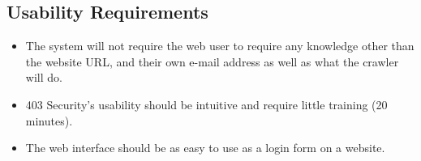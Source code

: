 \subsection{Usability Requirements}
\begin{itemize} 
    \item The system will not require the web user to require any knowledge other than the website URL, and their own e-mail address as well as what the crawler will do.
    \item {}403 Security's usability should be intuitive and require little training (20 minutes).
    \item The web interface should be as easy to use as a login form on a website.

\end{itemize}
